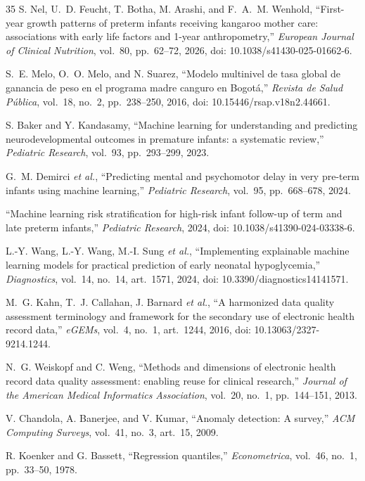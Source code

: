 \begin{thebibliography}{35}
S. Nel, U.~D. Feucht, T. Botha, M. Arashi, and F.~A.~M. Wenhold, ``First-year growth patterns of preterm infants receiving kangaroo mother care: associations with early life factors and 1-year anthropometry,'' \emph{European Journal of Clinical Nutrition}, vol.~80, pp.~62--72, 2026, doi: 10.1038/s41430-025-01662-6.

S.~E. Melo, O.~O. Melo, and N. Suarez, ``Modelo multinivel de tasa global de ganancia de peso en el programa madre canguro en Bogotá,'' \emph{Revista de Salud Pública}, vol.~18, no.~2, pp.~238--250, 2016, doi: 10.15446/rsap.v18n2.44661.

S. Baker and Y. Kandasamy, ``Machine learning for understanding and predicting neurodevelopmental outcomes in premature infants: a systematic review,'' \emph{Pediatric Research}, vol.~93, pp.~293--299, 2023.

G.~M. Demirci \emph{et al.}, ``Predicting mental and psychomotor delay in very pre-term infants using machine learning,'' \emph{Pediatric Research}, vol.~95, pp.~668--678, 2024.

``Machine learning risk stratification for high-risk infant follow-up of term and late preterm infants,'' \emph{Pediatric Research}, 2024, doi: 10.1038/s41390-024-03338-6.

L.-Y. Wang, L.-Y. Wang, M.-I. Sung \emph{et al.}, ``Implementing explainable machine learning models for practical prediction of early neonatal hypoglycemia,'' \emph{Diagnostics}, vol.~14, no.~14, art.~1571, 2024, doi: 10.3390/diagnostics14141571.

M.~G. Kahn, T.~J. Callahan, J. Barnard \emph{et al.}, ``A harmonized data quality assessment terminology and framework for the secondary use of electronic health record data,'' \emph{eGEMs}, vol.~4, no.~1, art.~1244, 2016, doi: 10.13063/2327-9214.1244.

N.~G. Weiskopf and C. Weng, ``Methods and dimensions of electronic health record data quality assessment: enabling reuse for clinical research,'' \emph{Journal of the American Medical Informatics Association}, vol.~20, no.~1, pp.~144--151, 2013.

V. Chandola, A. Banerjee, and V. Kumar, ``Anomaly detection: A survey,'' \emph{ACM Computing Surveys}, vol.~41, no.~3, art.~15, 2009.

R. Koenker and G. Bassett, ``Regression quantiles,'' \emph{Econometrica}, vol.~46, no.~1, pp.~33--50, 1978.


\end{thebibliography}
